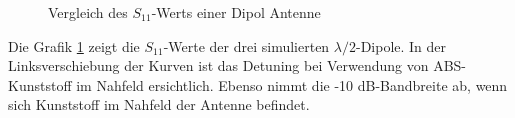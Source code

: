 
\begin{figure}[!ht]
	\centering
	\begingroup
	
	\endgroup
	\caption{Vergleich des $S_{11}$-Werts einer Dipol Antenne}
	\label{S11_Vergleich_Simulation}
\end{figure}
\newpage
Die Grafik \ref{S11_Vergleich_Simulation} zeigt die $S_{11}$-Werte der drei simulierten $\lambda/2$-Dipole. In der Linksverschiebung der Kurven ist das Detuning bei Verwendung von ABS-Kunststoff im Nahfeld ersichtlich. Ebenso nimmt die -10 dB-Bandbreite ab, wenn sich Kunststoff im Nahfeld der Antenne befindet.

